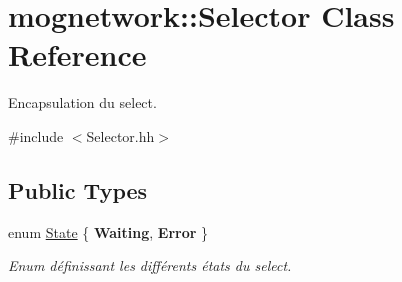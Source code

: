 \hypertarget{classmognetwork_1_1_selector}{\section{mognetwork\-:\-:Selector Class Reference}
\label{classmognetwork_1_1_selector}
}


Encapsulation du select.  




{\ttfamily \#include $<$Selector.\-hh$>$}

\subsection*{Public Types}
\begin{DoxyCompactItemize}
\item 
enum \hyperlink{classmognetwork_1_1_selector_a51d709c3579bf32265d68d4313df5794}{State} \{ {\bfseries Waiting}, 
{\bfseries Error}
 \}
\begin{DoxyCompactList}\small\item\em Enum définissant les différents états du select. \end{DoxyCompactList}\end{DoxyCompactItemize}
